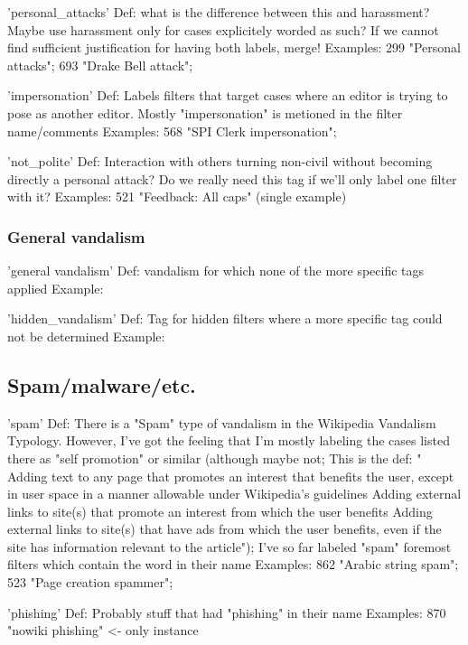 'personal\_attacks'
  Def: what is the difference between this and harassment? Maybe use harassment only for cases explicitely worded as such? If we cannot find sufficient justification for having both labels, merge! %
  Examples: 299 "Personal attacks"; 693 "Drake Bell attack";

'impersonation'
  Def: Labels filters that target cases where an editor is trying to pose as another editor. Mostly "impersonation" is metioned in the filter name/comments
  Examples: 568 "SPI Clerk impersonation";

'not\_polite'
  Def: Interaction with others turning non-civil without becoming directly a personal attack? Do we really need this tag if we'll only label one filter with it?
  Examples: 521 "Feedback: All caps" (single example)

\subsubsection{General vandalism}

'general vandalism'
 Def: vandalism for which none of the more specific tags applied
 Example:

'hidden\_vandalism'
 Def: Tag for hidden filters where a more specific tag could not be determined
 Example:

\subsection{Spam/malware/etc.}

'spam'
  Def: There is a "Spam" type of vandalism in the Wikipedia Vandalism Typology. However, I've got the feeling that I'm mostly labeling the cases listed there as "self promotion" or similar (although maybe not; This is the def: "    Adding text to any page that promotes an interest that benefits the user, except in user space in a manner allowable under Wikipedia's guidelines
    Adding external links to site(s) that promote an interest from which the user benefits
    Adding external links to site(s) that have ads from which the user benefits, even if the site has information relevant to the article");
  I've so far labeled "spam" foremost filters which contain the word in their name
  Examples: 862 "Arabic string spam";  523 "Page creation spammer";

'phishing'
  Def: Probably stuff that had "phishing" in their name
  Examples: 870 "nowiki phishing" <- only instance

